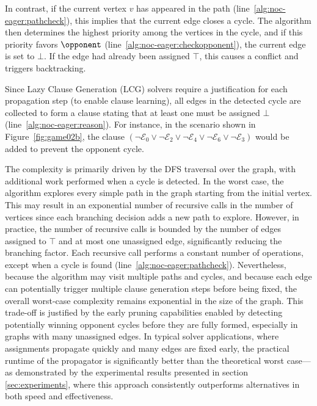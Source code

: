 \documentclass[runningheads]{llncs}
\begin{document}
In contrast, if the current vertex $v$ has appeared in the path (line~\ref{alg:noc-eager:pathcheck}), this implies that the current edge closes a cycle. The algorithm then determines the highest priority among the vertices in the cycle, and if this priority favors $\opponent$ (line~\ref{alg:noc-eager:checkopponent}), the current edge is set to $\bot$. If the edge had already been assigned $\top$, this causes a conflict and triggers backtracking.

Since Lazy Clause Generation (LCG) solvers require a justification for each propagation step (to enable clause learning), all edges in the detected cycle are collected to form a clause stating that at least one must be assigned $\bot$ (line~\ref{alg:noc-eager:reason}). For instance, in the scenario shown in Figure~\ref{fig:game02b}, the clause $(\neg \mathcal{E}_0 \vee \neg \mathcal{E}_2 \vee \neg \mathcal{E}_4 \vee \neg \mathcal{E}_6 \vee \neg \mathcal{E}_3)$ would be added to prevent the opponent cycle.

The complexity \noceager is primarily driven by the DFS traversal over the graph, with additional work performed when a cycle is detected. In the worst case, the algorithm explores every simple path in the graph starting from the initial vertex. This may result in an exponential number of recursive calls in the number of vertices since each branching decision adds a new path to explore. However, in practice, the number of recursive calls is bounded by the number of edges assigned to $\top$ and at most one unassigned edge, significantly reducing the branching factor. Each recursive call performs a constant number of operations, except when a cycle is found (line~\ref{alg:noc-eager:pathcheck}). Nevertheless, because the algorithm may visit multiple paths and cycles, and because each edge can potentially trigger multiple clause generation steps before being fixed, the overall worst-case complexity remains exponential in the size of the graph. This trade-off is justified by the early pruning capabilities enabled by detecting potentially winning opponent cycles before they are fully formed, especially in graphs with many unassigned edges. In typical solver applications, where assignments propagate quickly and many edges are fixed early, the practical runtime of the propagator is significantly better than the theoretical worst case—as demonstrated by the experimental results presented in section \ref{sec:experiments}, where this approach consistently outperforms alternatives in both speed and effectiveness.
\end{document}
